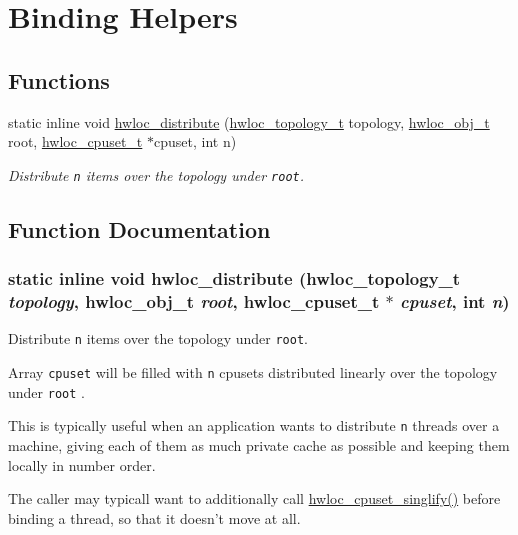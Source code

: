\hypertarget{group__hwlocality__helper__binding}{
\section{Binding Helpers}
\label{group__hwlocality__helper__binding}
}
\subsection*{Functions}
\begin{CompactItemize}
\item 
static inline void \hyperlink{group__hwlocality__helper__binding_gea68e92b026930cf5c368e2d98cb6aac}{hwloc\_\-distribute} (\hyperlink{group__hwlocality__topology_g9d1e76ee15a7dee158b786c30b6a6e38}{hwloc\_\-topology\_\-t} topology, \hyperlink{structhwloc__obj}{hwloc\_\-obj\_\-t} root, \hyperlink{group__hwlocality__cpuset_g82e51d695c430832b703dad5ab8d75e4}{hwloc\_\-cpuset\_\-t} $\ast$cpuset, int n)
\begin{CompactList}\small\item\em Distribute {\tt n} items over the topology under {\tt root}. \item\end{CompactList}\end{CompactItemize}


\subsection{Function Documentation}
\hypertarget{group__hwlocality__helper__binding_gea68e92b026930cf5c368e2d98cb6aac}{
\subsubsection[{hwloc\_\-distribute}]{\setlength{\rightskip}{0pt plus 5cm}static inline void hwloc\_\-distribute ({\bf hwloc\_\-topology\_\-t} {\em topology}, \/  {\bf hwloc\_\-obj\_\-t} {\em root}, \/  {\bf hwloc\_\-cpuset\_\-t} $\ast$ {\em cpuset}, \/  int {\em n})}}
\label{group__hwlocality__helper__binding_gea68e92b026930cf5c368e2d98cb6aac}


Distribute {\tt n} items over the topology under {\tt root}. 

Array {\tt cpuset} will be filled with {\tt n} cpusets distributed linearly over the topology under {\tt root} .

This is typically useful when an application wants to distribute {\tt n} threads over a machine, giving each of them as much private cache as possible and keeping them locally in number order.

The caller may typicall want to additionally call \hyperlink{group__hwlocality__cpuset_g548a6620cce008fc5b1e2110d25135fe}{hwloc\_\-cpuset\_\-singlify()} before binding a thread, so that it doesn't move at all. 
